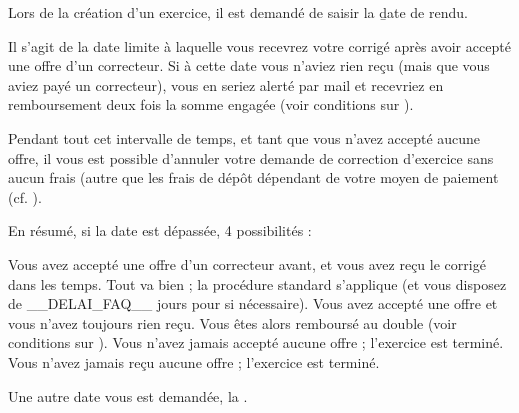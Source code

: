 Lors de la création d'un exercice, il est demandé de saisir la \b{date de rendu}.

Il s'agit de la date limite à laquelle vous recevrez votre corrigé après avoir accepté une offre d'un correcteur.
Si à cette date vous n'aviez rien reçu (mais que vous aviez payé un correcteur), vous en seriez alerté par mail et recevriez en remboursement deux fois la somme engagée (voir conditions sur ).

Pendant tout cet intervalle de temps, et tant que vous n'avez accepté aucune offre, il vous est possible d'annuler votre demande de correction d'exercice sans aucun frais (autre que les frais de dépôt dépendant de votre moyen de paiement (cf. ).

En résumé, si la date est dépassée, 4 possibilités :
\begin{enumerate}
\li Vous avez accepté une offre d'un correcteur avant, et vous avez reçu le corrigé dans les temps. Tout va bien ; la procédure standard s'applique (et vous disposez de __DELAI_FAQ__  jours pour  si nécessaire).
\li Vous avez accepté une offre et vous n'avez toujours rien reçu. Vous êtes alors remboursé au double  (voir conditions sur ).
\li Vous n'avez jamais accepté aucune offre ; l'exercice est terminé.
\li Vous n'avez jamais reçu aucune offre ; l'exercice est terminé.
\end{enumerate}

Une autre date vous est demandée, la .
